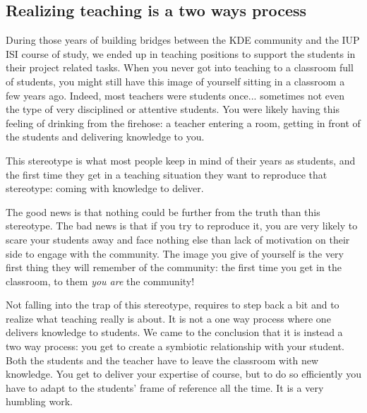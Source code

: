 \subsection*{Realizing teaching is a two ways process}
During those years of building bridges between the KDE community and the IUP ISI course of study, we ended up in teaching positions to support the students in their project related tasks. When you never got into teaching to a classroom full of students, you might still have this image of yourself sitting in a classroom a few years ago. Indeed, most teachers were students once... sometimes not even the type of very disciplined or attentive students. You were likely having this feeling of drinking from the firehose: a teacher entering a room, getting in front of the students and delivering knowledge to you.

This stereotype is what most people keep in mind of their years as students, and the first time they get in a teaching situation they want to reproduce that stereotype: coming with knowledge to deliver.

The good news is that nothing could be further from the truth than this stereotype. The bad news is that if you try to reproduce it, you are very likely to scare your students away and face nothing else than lack of motivation on their side to engage with the community. The image you give of yourself is the very first thing they will remember of the community: the first time you get in the classroom, to them \emph{you are} the community!

Not falling into the trap of this stereotype, requires to step back a bit and to realize what teaching really is about. It is not a one way process where one delivers knowledge to students. We came to the conclusion that it is instead a two way process: you get to create a symbiotic relationship with your student. Both the students and the teacher have to leave the classroom with new knowledge. You get to deliver your expertise of course, but to do so efficiently you have to adapt to the students' frame of reference all the time. It is a very humbling work.

